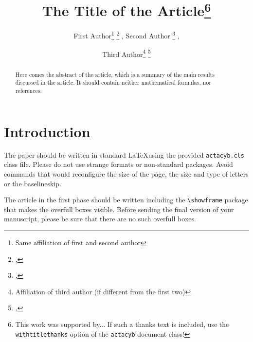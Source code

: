 \documentclass[withtitlethanks]{actacyb}
\begin{document}


\title{The Title of the Article\thanks{This work was supported by... If such a thanks text is included, use the {\tt withtitlethanks} option of the {\tt actacyb} document class!}}

\author{
First Author\thanks{Same affiliation of first and second author} \thanks{, } , Second Author \thanks{, } ,
\and Third Author\thanks{Affiliation of third author (if different from the first two)} \thanks{, }}


\maketitle


\begin{abstract}
Here comes the abstract of the article, which is a summary of the main results discussed in the article. It should contain neither mathematical formulas, nor references. 

\end{abstract}


\section{Introduction}

The paper should be written in standard \LaTeX using the provided \verb|actacyb.cls| class file. Please do not use strange formats or non-standard packages. Avoid commands that would reconfigure the size of the page, the size and type of letters or the baselineskip. 

The article in the first phase should be written including the \verb|\showframe| package that makes the overfull boxes visible. Before sending the final version of your manuscript, please be sure that there are no such overfull boxes.
\end{document}
